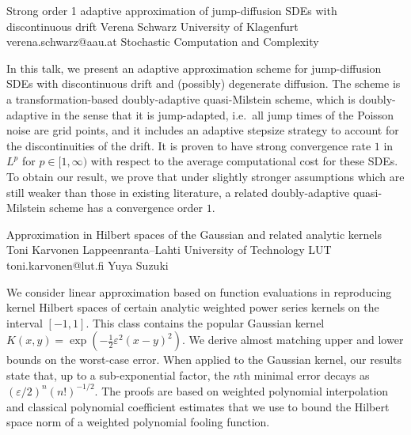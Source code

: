 \begin{talk}
  {Strong order 1 adaptive approximation of jump-diffusion SDEs with discontinuous drift}%
  {Verena Schwarz}%
  {University of Klagenfurt}%
  {verena.schwarz@aau.at}%
  {}%
  {Stochastic Computation and Complexity}%
    

In this talk, we present an adaptive approximation scheme for jump-diffusion SDEs with discontinuous drift and (possibly) degenerate diffusion. The scheme is a transformation-based doubly-adaptive quasi-Milstein scheme, which 
is doubly-adaptive in the sense that it is jump-adapted, i.e.~all jump times of the Poisson noise are grid points, and it includes an adaptive stepsize strategy to account for the discontinuities of the drift. It is proven to have strong convergence rate $1$ in $L^p$ for $p\in[1,\infty)$ with respect to the average computational cost for these SDEs. 
To obtain our result, we prove that under slightly stronger assumptions which are still weaker than those in existing literature, a related doubly-adaptive quasi-Milstein scheme has a convergence order $1$. 
\end{talk}

\begin{talk}
  {Approximation in Hilbert spaces of the Gaussian and related analytic kernels}%
  {Toni Karvonen}%
  {Lappeenranta--Lahti University of Technology LUT}%
  {toni.karvonen@lut.fi}%
  {Yuya Suzuki}%
  
    
   

\medskip

We consider linear approximation based on function evaluations in reproducing
kernel Hilbert spaces of certain analytic weighted power series kernels on the interval $[-1, 1]$. This class contains the popular Gaussian kernel $K(x, y) = \exp(-\frac{1}{2} \varepsilon^2(x-y)^2)$.
We derive almost matching upper and lower bounds on the worst-case error. When applied to
the Gaussian kernel, our results state that, up to a sub-exponential factor, the
$n$th minimal error decays as $(\varepsilon/2)^n (n!)^{-1/2}$. The proofs are based on weighted
polynomial interpolation and classical polynomial coefficient estimates that we use
to bound the Hilbert space norm of a weighted polynomial fooling function.
\end{talk}
